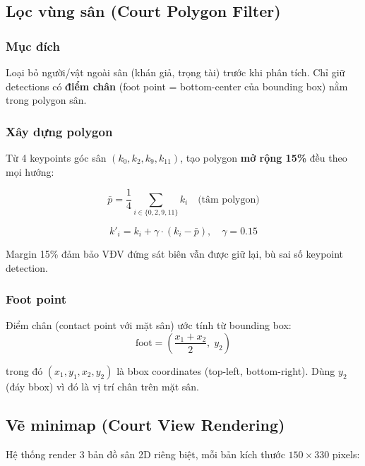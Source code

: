 \documentclass[12pt,a4paper]{article}
\begin{document}
\subsection{Lọc vùng sân (Court Polygon Filter)}
\label{sec:court_polygon}

\subsubsection{Mục đích}
Loại bỏ người/vật ngoài sân (khán giả, trọng tài) trước khi phân tích. Chỉ giữ detections có \textbf{điểm chân} (foot point = bottom-center của bounding box) nằm trong polygon sân.

\subsubsection{Xây dựng polygon}
Từ 4 keypoints góc sân $(k_0, k_2, k_9, k_{11})$, tạo polygon \textbf{mở rộng 15\%} đều theo mọi hướng:

\begin{equation}
\bar{p} = \frac{1}{4} \sum_{i \in \{0,2,9,11\}} k_i \quad \text{(tâm polygon)}
\end{equation}

\begin{equation}
k'_i = k_i + \gamma \cdot (k_i - \bar{p}), \quad \gamma = 0.15
\end{equation}

Margin 15\% đảm bảo VĐV đứng sát biên vẫn được giữ lại, bù sai số keypoint detection.

\subsubsection{Foot point}
Điểm chân (contact point với mặt sân) ước tính từ bounding box:
\begin{equation}
\text{foot} = \left(\frac{x_1 + x_2}{2}, \; y_2 \right)
\end{equation}

trong đó $(x_1, y_1, x_2, y_2)$ là bbox coordinates (top-left, bottom-right). Dùng $y_2$ (đáy bbox) vì đó là vị trí chân trên mặt sân.

\subsection{Vẽ minimap (Court View Rendering)}
\label{sec:rendering}

Hệ thống render 3 bản đồ sân 2D riêng biệt, mỗi bản kích thước $150 \times 330$ pixels:
\end{document}
